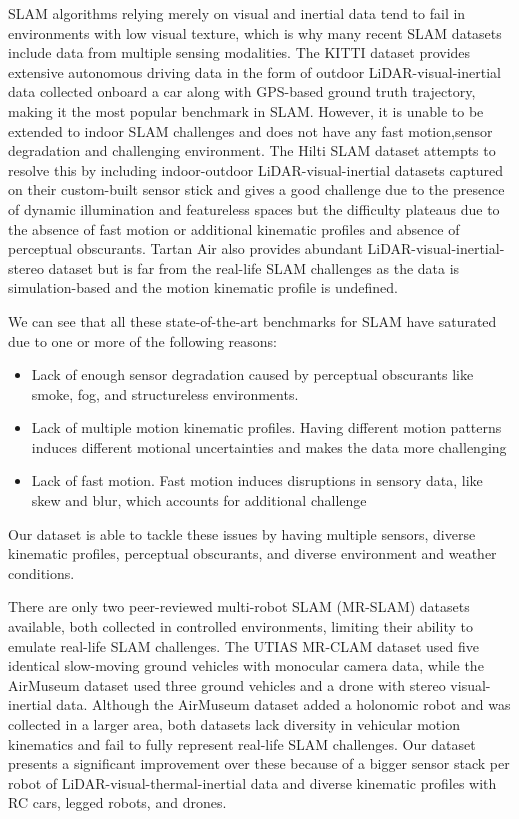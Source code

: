 \documentclass[10pt,twocolumn,letterpaper]{article}
\begin{document}
SLAM algorithms relying merely on visual and inertial data tend to fail in environments with low visual texture, which is why many recent SLAM datasets include data from multiple sensing modalities. The KITTI dataset\cite{geiger2013vision} provides extensive autonomous driving data in the form of outdoor LiDAR-visual-inertial data collected onboard a car along with GPS-based ground truth trajectory, making it the most popular benchmark in SLAM. However, it is unable to be extended to indoor SLAM challenges and does not have any fast motion,sensor degradation and challenging environment. The Hilti SLAM dataset\cite{helmberger2022hilti} attempts to resolve this by including indoor-outdoor LiDAR-visual-inertial datasets captured on their custom-built sensor stick and gives a good challenge due to the presence of dynamic illumination and featureless spaces but the difficulty plateaus due to the absence of fast motion or additional kinematic profiles and absence of perceptual obscurants. Tartan Air\cite{tartanair2020iros} also provides abundant LiDAR-visual-inertial-stereo dataset but is far from the real-life SLAM challenges as the data is simulation-based and the motion kinematic profile is undefined.

We can see that all these state-of-the-art benchmarks for SLAM have saturated due to one or more of the following reasons:

\begin{itemize}[noitemsep,topsep=0pt]
    \item Lack of enough sensor degradation caused by perceptual obscurants like smoke, fog, and structureless environments.
    \item Lack of multiple motion kinematic profiles. Having different motion patterns induces different motional uncertainties and makes the data more challenging
    \item Lack of fast motion. Fast motion induces disruptions in sensory data, like skew and blur, which accounts for additional challenge
\end{itemize}

Our dataset is able to tackle these issues by having multiple sensors, diverse kinematic profiles, perceptual obscurants, and diverse environment and weather conditions.

There are only two peer-reviewed multi-robot SLAM (MR-SLAM) datasets available, both collected in controlled environments, limiting their ability to emulate real-life SLAM challenges. The UTIAS MR-CLAM dataset\cite{utias} used five identical slow-moving ground vehicles with monocular camera data, while the AirMuseum dataset\cite{air_museum} used three ground vehicles and a drone with stereo visual-inertial data. Although the AirMuseum dataset added a holonomic robot and was collected in a larger area, both datasets lack diversity in vehicular motion kinematics and fail to fully represent real-life SLAM challenges. Our dataset presents a significant improvement over these because of a bigger sensor stack per robot of LiDAR-visual-thermal-inertial data and diverse kinematic profiles with RC cars, legged robots, and drones.
\end{document}
